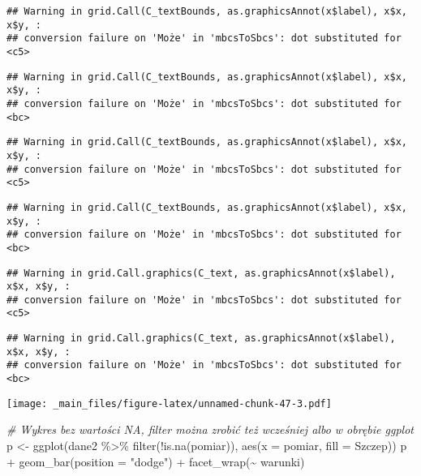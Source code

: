 \documentclass[
]{book}
\newenvironment{Shaded}{\begin{snugshade}}{\end{snugshade}}
\newcommand{\AttributeTok}[1]{\textcolor[rgb]{0.77,0.63,0.00}{#1}}
\newcommand{\CommentTok}[1]{\textcolor[rgb]{0.56,0.35,0.01}{\textit{#1}}}
\newcommand{\FunctionTok}[1]{\textcolor[rgb]{0.00,0.00,0.00}{#1}}
\newcommand{\NormalTok}[1]{#1}
\newcommand{\OtherTok}[1]{\textcolor[rgb]{0.56,0.35,0.01}{#1}}
\newcommand{\SpecialCharTok}[1]{\textcolor[rgb]{0.00,0.00,0.00}{#1}}
\newcommand{\StringTok}[1]{\textcolor[rgb]{0.31,0.60,0.02}{#1}}
\begin{document}
\begin{verbatim}
## Warning in grid.Call(C_textBounds, as.graphicsAnnot(x$label), x$x, x$y, :
## conversion failure on 'Może' in 'mbcsToSbcs': dot substituted for <c5>
\end{verbatim}

\begin{verbatim}
## Warning in grid.Call(C_textBounds, as.graphicsAnnot(x$label), x$x, x$y, :
## conversion failure on 'Może' in 'mbcsToSbcs': dot substituted for <bc>
\end{verbatim}

\begin{verbatim}
## Warning in grid.Call(C_textBounds, as.graphicsAnnot(x$label), x$x, x$y, :
## conversion failure on 'Może' in 'mbcsToSbcs': dot substituted for <c5>
\end{verbatim}

\begin{verbatim}
## Warning in grid.Call(C_textBounds, as.graphicsAnnot(x$label), x$x, x$y, :
## conversion failure on 'Może' in 'mbcsToSbcs': dot substituted for <bc>
\end{verbatim}

\begin{verbatim}
## Warning in grid.Call.graphics(C_text, as.graphicsAnnot(x$label), x$x, x$y, :
## conversion failure on 'Może' in 'mbcsToSbcs': dot substituted for <c5>
\end{verbatim}

\begin{verbatim}
## Warning in grid.Call.graphics(C_text, as.graphicsAnnot(x$label), x$x, x$y, :
## conversion failure on 'Może' in 'mbcsToSbcs': dot substituted for <bc>
\end{verbatim}

\texttt{[image: \_main\_files/figure-latex/unnamed-chunk-47-3.pdf]}

\begin{Shaded}
\begin{Highlighting}[]
\CommentTok{\# Wykres bez wartości NA, filter można zrobić też wcześniej albo w obrębie ggplot}
\NormalTok{p }\OtherTok{\textless{}{-}} \FunctionTok{ggplot}\NormalTok{(dane2 }\SpecialCharTok{\%\textgreater{}\%} \FunctionTok{filter}\NormalTok{(}\SpecialCharTok{!}\FunctionTok{is.na}\NormalTok{(pomiar)), }\FunctionTok{aes}\NormalTok{(}\AttributeTok{x =}\NormalTok{ pomiar, }\AttributeTok{fill =}\NormalTok{ Szczep))}
\NormalTok{p }\SpecialCharTok{+} \FunctionTok{geom\_bar}\NormalTok{(}\AttributeTok{position =} \StringTok{"dodge"}\NormalTok{) }\SpecialCharTok{+} \FunctionTok{facet\_wrap}\NormalTok{(}\SpecialCharTok{\textasciitilde{}}\NormalTok{ warunki)}
\end{Highlighting}
\end{Shaded}
\end{document}
